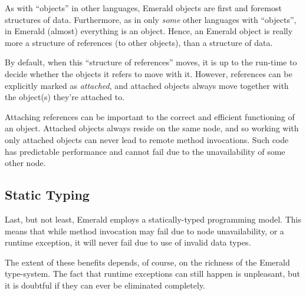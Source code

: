 As with ``objects'' in other languages, Emerald objects are first and
foremost structures of data.  Furthermore, as in only \emph{some}
other languages with ``objects'', in Emerald (almost) everything is an
object. Hence, an Emerald object is really more a structure of
references (to other objects), than a structure of data.

By default, when this ``structure of references'' moves, it is up to
the run-time to decide whether the objects it refers to move with it.
However, references can be explicitly marked as \emph{attached}, and
attached objects always move together with the object(s) they're
attached to.

Attaching references can be important to the correct and efficient
functioning of an object. Attached objects always reside on the same
node, and so working with only attached objects can never lead to
remote method invocations. Such code has predictable performance and
cannot fail due to the unavailability of some other node.

\subsection{Static Typing}

Last, but not least, Emerald employs a statically-typed programming
model. This means that while method invocation may fail due to node
unavailability, or a runtime exception, it will never fail due to
use of invalid data types.

The extent of these benefits depends, of course, on the richness of
the Emerald type-system. The fact that runtime exceptions can still
happen is unpleasant, but it is doubtful if they can ever be
eliminated completely.


